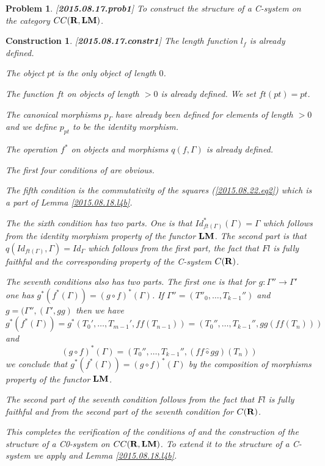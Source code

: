 \documentclass[11pt]{article}
\newtheorem{problem}[proposition]{Problem}
\newtheorem{construction}[proposition]{Construction}
\newcommand{\llabel}[1]{\label{#1}[{\bf #1}]}
\newcommand{\sr}{\rightarrow}
\newcommand{\rr}{{\bf R}}
\newcommand{\lm}{{\bf LM}}
\newcommand{\wh}{\widehat}
\newcommand{\hc}{\wh{\circ}}
\begin{document}
%
\begin{problem}\llabel{2015.08.17.prob1}
To construct the structure of a C-system on the category $CC(\rr,\lm)$.
\end{problem}
%
\begin{construction}\rm
\llabel{2015.08.17.constr1}
The length function $l_f$ is already defined.

The object $pt$ is the only object of length $0$.

The function $ft$ on objects of length $>0$ is already defined.  We set $ft(pt)=pt$.  

The canonical morphisms $p_{\Gamma}$ have already been defined for elements of length $>0$ and we define $p_{pt}$ to be the identity morphism.

The operation $f^*$ on objects and morphisms $q(f,\Gamma)$ is already defined.

The first four conditions of \cite[Definition 2.1]{Csubsystems} are obvious. 

The fifth condition is the commutativity of the squares (\ref{2015.08.22.eq2}) which is a part of Lemma \ref{2015.08.18.l4b}. 

The the sixth condition has two parts. One is that $Id_{ft(\Gamma)}^*(\Gamma)=\Gamma$ which follows from the identity morphism property of the functor $\lm$. The second part is that $q(Id_{ft(\Gamma)},\Gamma)=Id_{\Gamma}$ which follows from the first part, the fact that $Fl$ is fully faithful and the corresponding property of the C-system $C(\rr)$.

The seventh conditions also has two parts. The first one is that for $g:\Gamma''\sr \Gamma'$ one has $g^*(f^*(\Gamma))=(g\circ f)^*(\Gamma)$. If $\Gamma''=(T''_0,\dots,T_{k-1}'')$ and $g=(\Gamma'',(\Gamma',gg)$ then we have
%
$$g^*(f^*(\Gamma))=g^*(T_0',\dots,T_{m-1}',ff(T_{n-1}))=(T_0'',\dots,T_{k-1}'',gg(ff(T_n)))$$
%
and
%
$$(g\circ f)^*(\Gamma)=(T_0'',\dots,T_{k-1}'',(ff\hc gg)(T_n))$$
%
we conclude that $g^*(f^*(\Gamma))=(g\circ f)^*(\Gamma)$ by the composition of morphisms property of the functor $\lm$. 

The second part of the seventh condition follows from the fact that $Fl$ is fully faithful and from the second part of the seventh condition for $C(\rr)$.

This completes the verification of the conditions of \cite[Definition 2.1]{Csubsystems} and the construction of the structure of a C0-system on $CC(\rr,\lm)$. To extend it to the structure of a C-system we apply \cite[Proposition 2.4]{Csubsystems} and Lemma \ref{2015.08.18.l4b}. 
\end{construction}
%
%
%
\end{document}
